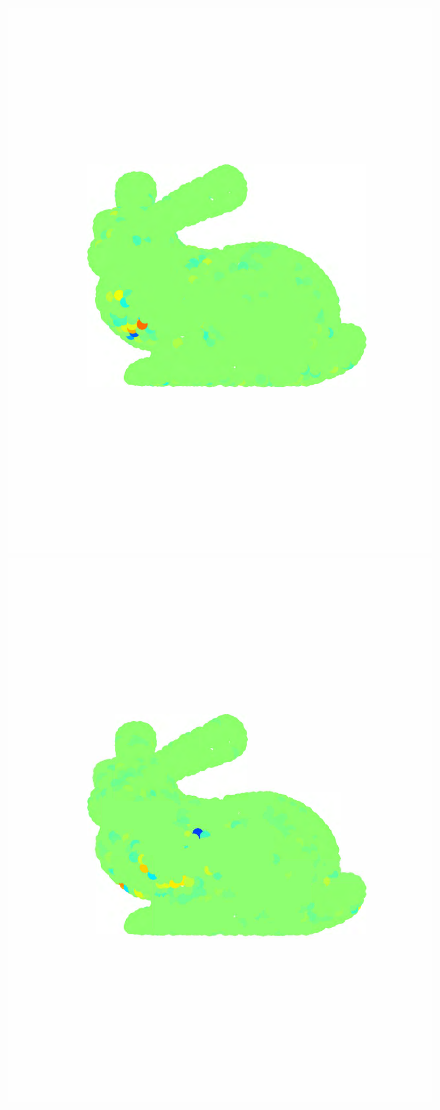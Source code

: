 \documentclass[journal, 10pt]{IEEEtran}
\begin{document}
\begin{figure}[bth]
\begin{minipage}[m]{0.16\linewidth}
\end{minipage}
\begin{minipage}[m]{0.16\linewidth}
\centerline{\includegraphics[width=.8\linewidth]{fig_bunny_coef_wav2}}
\end{minipage}
\begin{minipage}[m]{0.16\linewidth}
\centerline{\includegraphics[width=.8\linewidth]{fig_bunny_coef_wav3}}

\end{minipage}
\end{figure}
\end{document}
